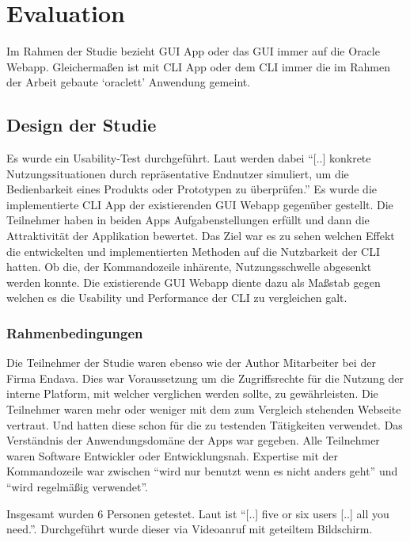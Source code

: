 \documentclass[oneside,bibliography=totocnumbered,BCOR=5mm]{scrbook}
\begin{document}
\chapter{Evaluation}
\label{sec:evaluation}

Im Rahmen der Studie bezieht GUI App oder das GUI immer auf die Oracle Webapp.
Gleichermaßen ist mit CLI App oder dem CLI immer die im Rahmen der Arbeit
gebaute `oraclett' Anwendung gemeint.

\section{Design der Studie}

Es wurde ein Usability-Test durchgeführt. Laut \cite[36]{hegner2003} werden
dabei ``[..] konkrete Nutzungssituationen durch repräsentative Endnutzer
simuliert, um die Bedienbarkeit eines Produkts oder Prototypen zu überprüfen.''
Es wurde die implementierte CLI App der existierenden GUI Webapp gegenüber
gestellt. Die Teilnehmer haben in beiden Apps Aufgabenstellungen erfüllt und
dann die Attraktivität der Applikation bewertet. Das Ziel war es zu sehen
welchen Effekt die entwickelten und implementierten Methoden auf die Nutzbarkeit
der CLI hatten. Ob die, der Kommandozeile inhärente, Nutzungsschwelle abgesenkt
werden konnte. Die existierende GUI Webapp diente dazu als Maßstab gegen welchen
es die Usability und Performance der CLI zu vergleichen galt.

\subsection{Rahmenbedingungen}

Die Teilnehmer der Studie waren ebenso wie der Author Mitarbeiter bei der
Firma Endava. Dies war Voraussetzung um die Zugriffsrechte für die Nutzung der
interne Platform, mit welcher verglichen werden sollte, zu gewährleisten. Die
Teilnehmer waren mehr oder weniger mit dem zum Vergleich stehenden Webseite
vertraut. Und hatten diese schon für die zu testenden Tätigkeiten verwendet. Das
Verständnis der Anwendungsdomäne der Apps war gegeben. Alle Teilnehmer waren
Software Entwickler oder Entwicklungsnah. Expertise mit der Kommandozeile war
zwischen ``wird nur benutzt wenn es nicht anders geht'' und ``wird regelmäßig
verwendet''.

\medskip

Insgesamt wurden 6 Personen getestet. Laut \cite[11]{Spolsky_2001} ist ``[..]
five or six users [..] all you need.''. Durchgeführt wurde dieser via Videoanruf
mit geteiltem Bildschirm.
\end{document}
